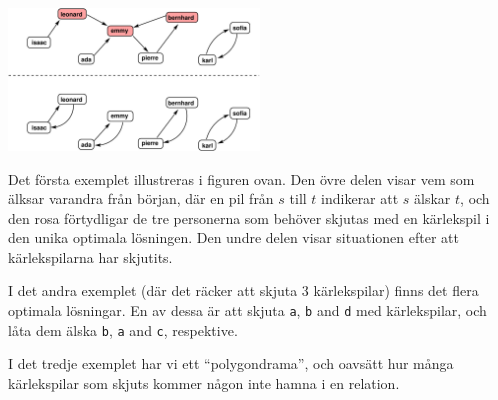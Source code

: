 \section*{\sampleexplanations}

\begin{center}
\includegraphics[width=0.5\textwidth]{polygonfig.pdf}
\end{center}
Det första exemplet illustreras i figuren ovan. Den övre delen visar vem som älksar varandra från början, där en pil från $s$ till $t$ indikerar att $s$ älskar $t$,
och den rosa förtydligar de tre personerna som behöver skjutas med en kärlekspil i den unika optimala lösningen. Den undre delen visar situationen efter att kärlekspilarna har skjutits.

I det andra exemplet (där det räcker att skjuta 3 kärlekspilar) finns det flera optimala lösningar.
En av dessa är att skjuta \texttt{a}, \texttt{b} and \texttt{d} med kärlekspilar, och låta dem älska \texttt{b}, \texttt{a} and \texttt{c}, respektive.

I det tredje exemplet har vi ett ``polygondrama'', och oavsätt hur många kärlekspilar som 
skjuts kommer någon inte hamna i en relation.
